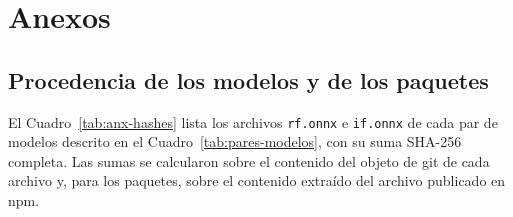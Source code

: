 \ifdefined\modoensamble
\else
	
\fi

\chapter{Anexos}
\label{cap:anexos}

\section{Procedencia de los modelos y de los paquetes}
\label{anx:procedencia}

El Cuadro~\ref{tab:anx-hashes} lista los archivos \texttt{rf.onnx} e \texttt{if.onnx} de cada par
de modelos descrito en el Cuadro~\ref{tab:pares-modelos}, con su suma SHA-256 completa. Las sumas
se calcularon sobre el contenido del objeto de git de cada archivo y, para los paquetes, sobre el
contenido extraído del archivo publicado en npm.

